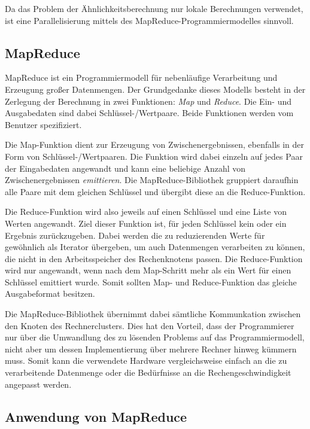 Da das Problem der Ähnlichkeitsberechnung nur lokale Berechnungen verwendet, ist eine Parallelisierung mittels des MapReduce-Programmiermodelles sinnvoll.

\subsection{MapReduce}
\label{mapreduce}

MapReduce \cite{dg2004} ist ein Programmiermodell für nebenläufige Verarbeitung und Erzeugung großer Datenmengen. Der Grundgedanke dieses Modells besteht in der Zerlegung der Berechnung in zwei Funktionen: \emph{Map} und \emph{Reduce}. Die Ein- und Ausgabedaten sind dabei Schlüssel-/Wertpaare. Beide Funktionen werden vom Benutzer spezifiziert.

Die Map-Funktion dient zur Erzeugung von Zwischenergebnissen, ebenfalls in der Form von Schlüssel-/Wertpaaren. Die Funktion wird dabei einzeln auf jedes Paar der Eingabedaten angewandt und kann eine beliebige Anzahl von Zwischenergebnissen \emph{emittieren}. Die MapReduce-Bibliothek gruppiert daraufhin alle Paare mit dem gleichen Schlüssel und übergibt diese an die Reduce-Funktion.

Die Reduce-Funktion wird also jeweils auf einen Schlüssel und eine Liste von Werten angewandt. Ziel dieser Funktion ist, für jeden Schlüssel kein oder ein Ergebnis zurückzugeben. Dabei werden die zu reduzierenden Werte für gewöhnlich als Iterator übergeben, um auch Datenmengen verarbeiten zu können, die nicht in den Arbeitsspeicher des Rechenknotens passen. Die Reduce-Funktion wird nur angewandt, wenn nach dem Map-Schritt mehr als ein Wert für einen Schlüssel emittiert wurde. Somit sollten Map- und Reduce-Funktion das gleiche Ausgabeformat besitzen.

Die MapReduce-Bibliothek übernimmt dabei sämtliche Kommunkation zwischen den Knoten des Rechnerclusters. Dies hat den Vorteil, dass der Programmierer nur über die Umwandlung des zu lösenden Problems auf das Programmiermodell, nicht aber um dessen Implementierung über mehrere Rechner hinweg kümmern muss. Somit kann die verwendete Hardware vergleichsweise einfach an die zu verarbeitende Datenmenge oder die Bedürfnisse an die Rechengeschwindigkeit angepasst werden.

\subsection{Anwendung von MapReduce}
\label{mapreduce_cooccurence}

